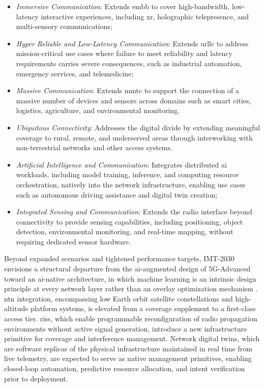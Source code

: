 \begin{itemize}
    \item \emph{Immersive Communication}: Extends \ac{embb} to cover high-bandwidth, low-latency interactive experiences, including \ac{xr}, holographic telepresence, and multi-sensory communications;
    \item \emph{Hyper Reliable and Low-Latency Communication}: Extends \ac{urllc} to address mission-critical use cases where failure to meet reliability and latency     requirements carries severe consequences, such as industrial automation, emergency services, and telemedicine;
    \item \emph{Massive Communication}: Extends \ac{mmtc} to support the connection of a massive number of devices and sensors across domains such as smart cities, logistics, agriculture, and environmental monitoring.
    \item \emph{Ubiquitous Connectivity}: Addresses the digital divide by extending meaningful coverage to rural, remote, and underserved areas through interworking with non-terrestrial networks and other access systems.
    \item \emph{Artificial Intelligence and Communication}: Integrates distributed \ac{ai} workloads, including model training, inference, and computing resource 
    orchestration, natively into the network infrastructure, enabling use cases such as autonomous driving assistance and digital twin creation;
    \item \emph{Integrated Sensing and Communication}: Extends the radio interface beyond connectivity to provide sensing capabilities, including positioning, object detection, environmental monitoring, and real-time mapping, without requiring dedicated sensor hardware.
\end{itemize}

Beyond expanded scenarios and tightened performance targets, IMT-2030 envisions a structural departure from the \ac{ai}-augmented design of 5G-Advanced toward an \ac{ai}-native architecture, in which machine learning is an intrinsic design principle at every network layer rather than an overlay optimization mechanism \cite{IMTFrameworkoverallobjectivesfuturedevelopment2023}. \acf{ntn} integration, encompassing low Earth orbit satellite constellations and high-altitude platform systems, is elevated from a coverage supplement to a first-class access tier. \acp{ris}, which enable programmable reconfiguration of radio propagation environments without active signal generation, introduce a new infrastructure primitive for coverage and interference management. Network digital twins, which are software replicas of the physical infrastructure maintained in real time from live telemetry, are expected to serve as native management primitives, enabling closed-loop automation, predictive resource allocation, and intent verification prior to deployment.

